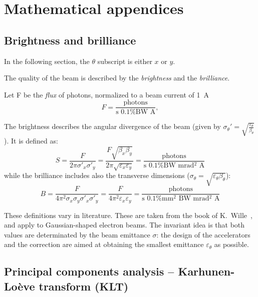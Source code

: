 
\chapter{Mathematical appendices}
\section{Brightness and brilliance}
\label{apx:brightness_brilliance}
In the following section, the $\theta$ subscript is either $x$ or $y$.

The quality of the beam is described by the \emph{brightness} and the \emph{brilliance}.

Let F be the \emph{flux} of photons, normalized to a beam current of 1~A
\begin{equation}
F = \frac{\text{photons}}{\text{s 0.1\% BW A}},
\end{equation}

The brightness describes the angular divergence of the beam (given by $\sigma_\theta'=\sqrt{\frac{\varepsilon_\theta}{\beta_\theta}}$). It is defined as:
\begin{equation}
S = \frac{F}{2 \pi \sigma'_x \sigma'_y} = \frac{F \sqrt{\beta_x \beta_y}}{2 \pi \sqrt{\varepsilon_x \varepsilon_y}} = \frac{\text{photons}}{\text{s 0.1\% BW mrad$^2$ A}}
\end{equation}
while the brilliance includes also the transverse dimensions ($\sigma_\theta=\sqrt{\varepsilon_\theta \beta_\theta}$):
\begin{equation}
B = \frac{F}{4 \pi^2 \sigma_x \sigma_y \sigma'_x \sigma'_y} = \frac{F}{4 \pi^2 \varepsilon_x \varepsilon_y} = \frac{\text{photons}}{\text{s 0.1\% mm$^2$ BW mrad$^2$ A}}
\end{equation}

These definitions vary in literature. These are taken from the book of K.~Wille~\cite{book:wille}, and apply to Gaussian-shaped electron beams. The invariant idea is that both values are determinated by the beam emittance $\sigma$: the design of the accelerators and the correction are aimed at obtaining the smallest emittance $\varepsilon_\theta$ as possible.

\section{Principal components analysis -- Karhunen-Loève transform (KLT)}
\label{apx:KLT}

